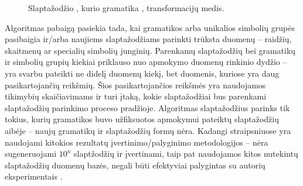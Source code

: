 \documentclass{VUMIFInfBakalaurinis}
\begin{document}
\begin{figure}
  \caption{
    Slaptažodžio , kurio gramatika ,
    transformacijų medis.
  }
  \label{plot:pcfgtransforms}
\end{figure}

Algoritmas pabaigą pasiekia tada, kai gramatikos arba unikalios simbolių grupės 
pasibaigia ir/arba naujiems slaptažodžiams parinkti trūksta duomenų -- raidžių, 
skaitmenų ar specialių simbolių junginių. Parenkamų slaptažodžių bei gramatikų 
ir simbolių grupių kiekiai priklauso nuo apmokymo duomenų rinkinio dydžio -- yra 
svarbu pateikti ne didelį duomenų kiekį, bet duomenis, kuriose yra daug 
pasikartojančių reikšmių. Šios pasikartojančios reikšmės yra naudojamos 
tikimybių skaičiavimams ir turi įtaką, kokie slaptažodžiai bus parenkami 
slaptažodžių parinkimo proceso pradžioje.
Algoritmas slaptažodžius parinks tik tokius, kurių gramatikos buvo užfiksuotos 
apmokymui pateiktų slaptažodžių aibėje -- naujų gramatikų ir slaptažodžių formų 
nėra.
Kadangi  straipsniuose \cite{PCFG1,PCFG2} yra naudojami kitokios 
rezultatų įvertinimo/palyginimo metodologijos -- nėra sugeneruojami $10^n$ 
slaptžodžių ir įvertinami, taip pat naudojamos kitos nutekintų slaptažodžių 
duomenų bazės, negali būti efektyviai palygintas su  autorių 
eksperimentais \cite{PassGAN}.
\end{document}
